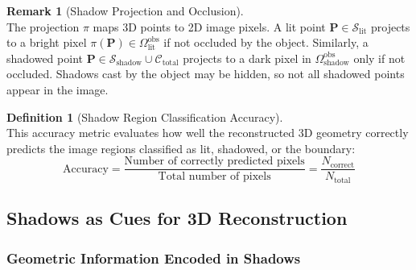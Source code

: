 \documentclass[12pt]{article}
\newcommand{\vect}[1]{\bm{#1}}
\theoremstyle{definition}
\newtheorem{definition}{Definition}[subsection]
\newtheorem{remark}{Remark}[subsection]
\begin{document}
\begin{remark}[Shadow Projection and Occlusion] \label{rmk:shadow_projection} ~\\
The projection $\pi$ maps 3D points to 2D image pixels. A lit point $\vect{P} \in \mathcal{S}_{\text{lit}}$ projects to a bright pixel $\pi(\vect{P}) \in \Omega_{\text{lit}}^{\text{obs}}$ if not occluded by the object. Similarly, a shadowed point $\vect{P} \in \mathcal{S}_{\text{shadow}} \cup \mathcal{C}_{\text{total}}$ projects to a dark pixel in $\Omega_{\text{shadow}}^{\text{obs}}$ only if not occluded. Shadows cast by the object may be hidden, so not all shadowed points appear in the image.
\end{remark}

\begin{definition}[Shadow Region Classification Accuracy] \label{def:shadow_accuracy} ~\\
This accuracy metric evaluates how well the reconstructed 3D geometry correctly predicts the image regions classified as lit, shadowed, or the boundary:
\begin{equation}
\text{Accuracy} = \frac{\text{Number of correctly predicted pixels}}{\text{Total number of pixels}} = \frac{N_{\text{correct}}}{N_{\text{total}}}
\end{equation}
\end{definition}

\subsection{Shadows as Cues for 3D Reconstruction} \label{sec:shadow_cues}

\subsubsection*{Geometric Information Encoded in Shadows} \label{sec:shadow_geom_info}
\end{document}
